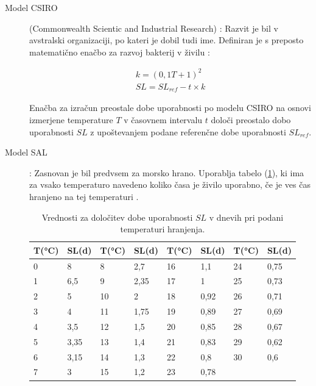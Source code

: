 \documentclass[a4paper, 12pt]{book}
\begin{document}
\begin{description}

	\item[Model CSIRO] (Commonwealth Scientic and Industrial Research) : Razvit je bil v avstralski organizaciji, po kateri je dobil tudi ime. Definiran je s preposto matematično enačbo za razvoj bakterij v živilu \cite{magistrska-marolt}:
	
	\begin{align}
		k = (0,1T + 1)^2				\nonumber \\
       	SL = SL_{ref} - t \times k		\nonumber
	\end{align}
	
	Enačba za izračun preostale dobe uporabnosti po modelu CSIRO na osnovi izmerjene temperature $T$ v časovnem intervalu $t$ določi preostalo dobo uporabnosti $SL$ z upoštevanjem podane referenčne dobe uporabnosti $SL_{ref}$.
	
	\item[Model SAL] : Zasnovan je bil predvsem za morsko hrano. Uporablja tabelo (\ref{tab:tabela-sal}), ki ima za vsako temperaturo navedeno koliko časa je živilo uporabno, če je ves čas hranjeno na tej temperaturi \cite{magistrska-marolt}. 

\begin{table}[h]
\begin{center}
\begin{tabular}{ll|ll|ll|ll}
T(°C) & SL(d) & T(°C) & SL(d) & T(°C) & SL(d) & T(°C) & SL(d) \\ \hline
0     & 8     & 8     & 2,7   & 16    & 1,1   & 24    & 0,75  \\
1     & 6,5   & 9     & 2,35  & 17    & 1     & 25    & 0,73  \\
2     & 5     & 10    & 2     & 18    & 0,92  & 26    & 0,71  \\
3     & 4     & 11    & 1,75  & 19    & 0,89  & 27    & 0,69  \\
4     & 3,5   & 12    & 1,5   & 20    & 0,85  & 28    & 0,67  \\
5     & 3,35  & 13    & 1,4   & 21    & 0,83  & 29    & 0,62  \\
6     & 3,15  & 14    & 1,3   & 22    & 0,8   & 30    & 0,6   \\
7     & 3     & 15    & 1,2   & 23    & 0,78  &       &      
\end{tabular}
\caption{Vrednosti za določitev dobe uporabnosti $SL$ v dnevih pri podani temperaturi hranjenja.}
\label{tab:tabela-sal}
\end{center}
\end{table}
	
\end{description}
\end{document}
